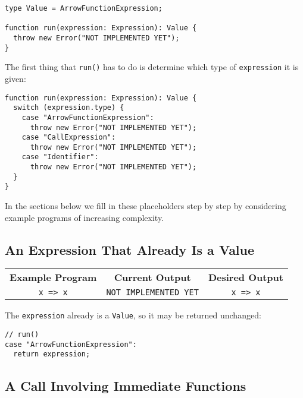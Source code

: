 \documentclass[12pt, oneside]{book}
\begin{document}
\begin{verbatim}
type Value = ArrowFunctionExpression;

function run(expression: Expression): Value {
  throw new Error("NOT IMPLEMENTED YET");
}
\end{verbatim}

The first thing that \texttt{run()} has to do is determine which type of \texttt{expression} it is given:

\begin{verbatim}
function run(expression: Expression): Value {
  switch (expression.type) {
    case "ArrowFunctionExpression":
      throw new Error("NOT IMPLEMENTED YET");
    case "CallExpression":
      throw new Error("NOT IMPLEMENTED YET");
    case "Identifier":
      throw new Error("NOT IMPLEMENTED YET");
  }
}
\end{verbatim}

In the sections below we fill in these placeholders step by step by considering example programs of increasing complexity.

\subsection{An Expression That Already Is a Value}
\label{An Expression That Already Is a Value}

\begin{center}
\begin{tabular}{c|c|c}
\textbf{Example Program} & \textbf{Current Output} & \textbf{Desired Output} \\
\texttt{x => x} & \texttt{NOT IMPLEMENTED YET} & \texttt{x => x} \\
\end{tabular}
\end{center}

\noindent The \texttt{expression} already is a \texttt{Value}, so it may be returned unchanged:

\begin{verbatim}
// run()
case "ArrowFunctionExpression":
  return expression;
\end{verbatim}

\subsection{A Call Involving Immediate Functions}
\label{A Call Involving Immediate Functions}
\end{document}

